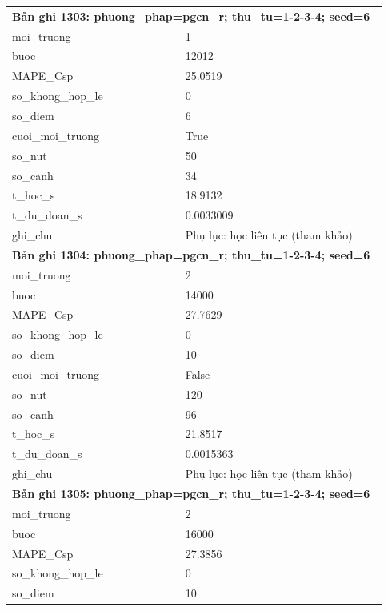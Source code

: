 \begin{longtable}{p{0.43\linewidth}p{0.50\linewidth}}
\midrule
\multicolumn{2}{p{0.95\linewidth}}{\textbf{Bản ghi 1303: phuong\_phap=pgcn\_r; thu\_tu=1-2-3-4; seed=6}} \\
moi\_\allowbreak truong & 1 \\
buoc & 12012 \\
MAPE\_\allowbreak Csp & 25.0519 \\
so\_\allowbreak khong\_\allowbreak hop\_\allowbreak le & 0 \\
so\_\allowbreak diem & 6 \\
cuoi\_\allowbreak moi\_\allowbreak truong & True \\
so\_\allowbreak nut & 50 \\
so\_\allowbreak canh & 34 \\
t\_\allowbreak hoc\_\allowbreak s & 18.9132 \\
t\_\allowbreak du\_\allowbreak doan\_\allowbreak s & 0.0033009 \\
ghi\_\allowbreak chu & Phụ lục: học liên tục (tham khảo) \\
\midrule
\multicolumn{2}{p{0.95\linewidth}}{\textbf{Bản ghi 1304: phuong\_phap=pgcn\_r; thu\_tu=1-2-3-4; seed=6}} \\
moi\_\allowbreak truong & 2 \\
buoc & 14000 \\
MAPE\_\allowbreak Csp & 27.7629 \\
so\_\allowbreak khong\_\allowbreak hop\_\allowbreak le & 0 \\
so\_\allowbreak diem & 10 \\
cuoi\_\allowbreak moi\_\allowbreak truong & False \\
so\_\allowbreak nut & 120 \\
so\_\allowbreak canh & 96 \\
t\_\allowbreak hoc\_\allowbreak s & 21.8517 \\
t\_\allowbreak du\_\allowbreak doan\_\allowbreak s & 0.0015363 \\
ghi\_\allowbreak chu & Phụ lục: học liên tục (tham khảo) \\
\midrule
\multicolumn{2}{p{0.95\linewidth}}{\textbf{Bản ghi 1305: phuong\_phap=pgcn\_r; thu\_tu=1-2-3-4; seed=6}} \\
moi\_\allowbreak truong & 2 \\
buoc & 16000 \\
MAPE\_\allowbreak Csp & 27.3856 \\
so\_\allowbreak khong\_\allowbreak hop\_\allowbreak le & 0 \\
so\_\allowbreak diem & 10 \\

\end{longtable}
